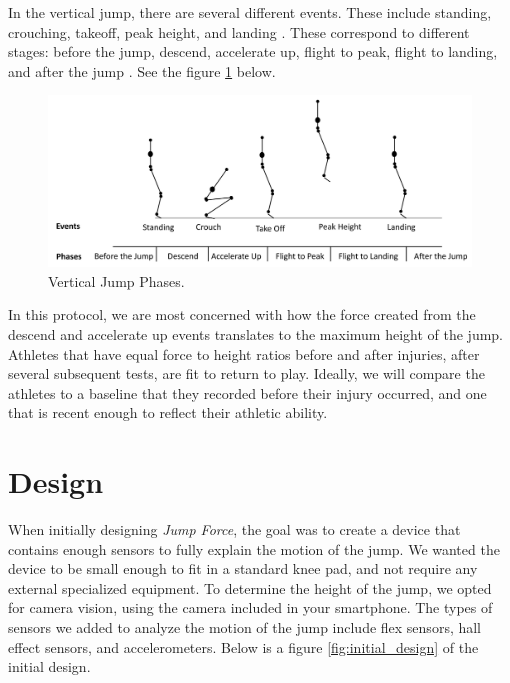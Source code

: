 \documentclass[manuscript,screen,review]{acmart}
\begin{document}
In the vertical jump, there are several different events. These include standing, crouching, takeoff, peak height, and landing \cite{Petersen2013}. These correspond to different stages: before the jump, descend, accelerate up, flight to peak, flight to landing, and after the jump \cite{Petersen2013}. See the figure \ref{fig:jump_phases} below. 


\begin{figure}[ht]
  \centering
  \includegraphics[width=\linewidth]{images/jump_phases.png}
  \caption{Vertical Jump Phases.}
  \label{fig:jump_phases}
\end{figure}

In this protocol, we are most concerned with how the force created from the descend and accelerate up events translates to the maximum height of the jump. Athletes that have equal force to height ratios before and after injuries, after several subsequent tests, are fit to return to play. Ideally, we will compare the athletes to a baseline that they recorded before their injury occurred, and one that is recent enough to reflect their athletic ability.

\section{Design}

When initially designing \textit{Jump Force}, the goal was to create a device that contains enough sensors to fully explain the motion of the jump. We wanted the device to be small enough to fit in a standard knee pad, and not require any external specialized equipment. To determine the height of the jump, we opted for camera vision, using the camera included in your smartphone. The types of sensors we added to analyze the motion of the jump include flex sensors, hall effect sensors, and accelerometers. Below is a figure \ref{fig:initial_design} of the initial design.
\end{document}
